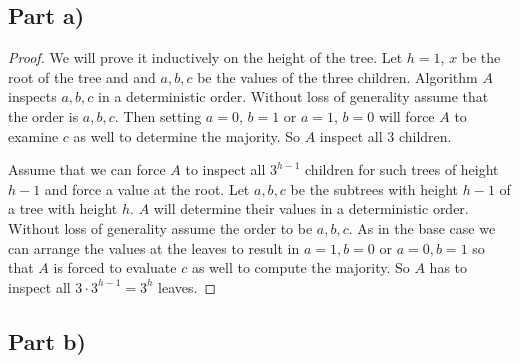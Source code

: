 \documentclass[10pt,a4paper]{article}
\begin{document}
\subsection*{Part a)}

\begin{proof}
  We will prove it inductively on the height of the tree.
  Let $h = 1$, $x$ be the root of the tree and and $a, b, c$ be the values of the three children.
  Algorithm $A$ inspects $a, b, c$ in a deterministic order.
  Without loss of generality assume that the order is $a, b, c$.
  Then setting $a = 0$, $b = 1$ or $a = 1$, $b = 0$ will force $A$ to examine $c$ as well to determine the majority.
  So $A$ inspect all $3$ children.

  \vspace{1em}

  Assume that we can force $A$ to inspect all $3^{h - 1}$ children for such trees of height $h - 1$ and force a value at the root.
  Let $a, b, c$ be the subtrees with height $h - 1$ of a tree with height $h$.
  $A$ will determine their values in a deterministic order.
  Without loss of generality assume the order to be $a, b, c$.
  As in the base case we can arrange the values at the leaves to result in $a = 1, b = 0$ or $a = 0, b = 1$ so that $A$ is forced to evaluate $c$ as well to compute the majority.
  So $A$ has to inspect all $3 \cdot 3^{h - 1} = 3^{h}$ leaves.
\end{proof}

\subsection*{Part b)}
\end{document}
